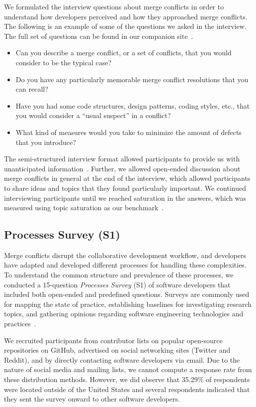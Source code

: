 We formulated the interview questions about merge conflicts in order to understand how developers perceived and how they approached merge conflicts.
The following is an example of some of the questions we asked in the interview.
The full set of questions can be found in our companion site~\cite{companion_site}.
\begin{itemize}
	\item Can you describe a merge conflict, or a set of conflicts, that you would consider to be the typical case?
	\item Do you have any particularly memorable merge conflict resolutions that you can recall?
	\item Have you had some code structures, design patterns, coding styles, etc., that you would consider a ``usual suspect'' in a conflict?
	\item What kind of measures would you take to minimize the amount of defects that you introduce?
\end{itemize}

The semi-structured interview format allowed participants to provide us with unanticipated information~\cite{seaman2008qualitative}. 
Further, we allowed open-ended discussion about merge conflicts in general at the end of the interview, which allowed participants to share ideas and topics that they found particularly important. 
We continued interviewing participants until we reached saturation in the answers, which was measured using topic saturation as our benchmark~\cite{fusch2015we}.

\subsection{Processes Survey (S1)}\label{processes_survey}

Merge conflicts disrupt the collaborative development workflow, and developers have adapted and developed different processes for handling these complexities.
To understand the common structure and prevalence of these processes, we conducted a 15-question \textit{Processes Survey} (S1) of software developers that included both open-ended and predefined questions.
Surveys are commonly used for mapping the state of practice, establishing baselines for investigating research topics, and gathering opinions regarding software engineering technologies and practices~\cite{deMello2016survey}.

We recruited participants from contributor lists on popular open-source repositories on GitHub, advertised on social networking sites (Twitter and Reddit), and by directly contacting software developers via email.
Due to the nature of social media and mailing lists, we cannot compute a response rate from these distribution methods.
However, we did observe that 35.29\% of respondents were located outside of the United States and several respondents indicated that they sent the survey onward to other software developers.

